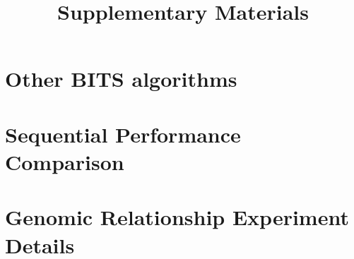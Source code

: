 \documentclass[12pt]{article}
\title{Supplementary Materials}
\begin{document}
  \maketitle

\section{Other BITS algorithms}



\section{Sequential Performance Comparison}






\section{Genomic Relationship Experiment Details}

\end{document}
